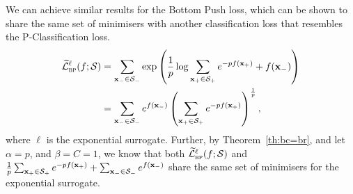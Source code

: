 We can achieve similar results for the Bottom Push loss, 
which can be shown to share the same set of minimisers with another classification loss that resembles the P-Classification loss.
\begin{equation*}
\begin{aligned}
\widetilde{\mathcal{L}}_\textsc{bp}^\ell(f; \mathcal{S})
&= \sum_{\mathbf{x}_- \in \mathcal{S}_-} \exp \left( \frac{1}{p} \log \sum_{\mathbf{x}_+ \in \mathcal{S}_+} e^{-p f(\mathbf{x}_+)} + f(\mathbf{x}_-) \right) \\
&= \sum_{\mathbf{x}_- \in \mathcal{S}_-} e^{f(\mathbf{x}_-)} \left( \sum_{\mathbf{x}_+ \in \mathcal{S}_+} e^{-p f(\mathbf{x}_+)} \right)^\frac{1}{p},
\end{aligned}
\end{equation*}
where $\ell$ is the exponential surrogate.
Further, by Theorem~\ref{th:bc=br}, and let $\alpha = p$, and $\beta = C = 1$,
we know that both $\widetilde{\mathcal{L}}_\textsc{bp}^\ell(f; \mathcal{S})$ and 
$\frac{1}{p} \sum_{\mathbf{x}_+ \in \mathcal{S}_+} e^{-p f(\mathbf{x}_+)} + \sum_{\mathbf{x}_- \in \mathcal{S}_-} e^{f(\mathbf{x}_-)}$
share the same set of minimisers for the exponential surrogate.
